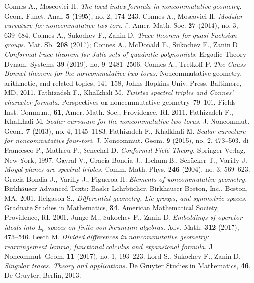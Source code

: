 \documentclass[12pt]{article}
\begin{document}
\begin{thebibliography}{99}
 Connes A., Moscovici H. {\it The local index formula in noncommutative geometry.} Geom. Funct. Anal. {\bf 5} (1995), no. 2, 174--243.
 Connes A., Moscovici H. {\it Modular curvature for noncommutative two-tori.} J. Amer. Math. Soc. {\bf 27} (2014), no. 3, 639--684.
 Connes A., Sukochev F., Zanin D. {\it Trace theorem for quasi-Fuchsian groups.} Mat. Sb. {\bf 208} (2017); Connes A., McDonald E., Sukochev F., Zanin D {\it Conformal trace theorem for Julia sets of quadratic polynomials.} Ergodic Theory Dynam. Systems {\bf 39} (2019), no. 9, 2481--2506.
 Connes A., Tretkoff P. {\it The Gauss-Bonnet theorem for the noncommutative two torus.} Noncommutative geometry, arithmetic, and related topics, 141--158, Johns Hopkins Univ. Press, Baltimore, MD, 2011.
 Fathizadeh F., Khalkhali M. {\it Twisted spectral triples and Connes' character formula.} Perspectives on noncommutative geometry, 79--101, Fields Inst. Commun., {\bf 61}, Amer. Math. Soc., Providence, RI, 2011.
 Fathizadeh F., Khalkhali M. {\it Scalar curvature for the noncommutative two torus.} J. Noncommut. Geom. {\bf 7} (2013), no. 4, 1145--1183; Fathizadeh F., Khalkhali M. {\it Scalar curvature for noncommutative four-tori.} J. Noncommut. Geom. {\bf 9} (2015), no. 2, 473--503.
 di Francesco P., Mathieu P., Senechal D. {\it Conformal Field Theory.} Springer-Verlag, New York, 1997.
 Gayral V., Gracia-Bondia J., Iochum B., Sch\"ucker T., Varilly J. {\it Moyal planes are spectral triples.} Comm. Math. Phys. {\bf 246} (2004), no. 3, 569--623.
 Gracia-Bondia J., Varilly J., Figueroa H. {\it Elements of noncommutative geometry.} Birkh\"auser Advanced Texts: Basler Lehrb\"ucher. Birkh\"auser Boston, Inc., Boston, MA, 2001.
 Helgason S., {\it Differential geometry, Lie groups, and symmetric spaces.} Graduate Studies in Mathematics, {\bf 34}. American Mathematical Society, Providence, RI, 2001.
 Junge M., Sukochev F., Zanin D. {\it Embeddings of operator ideals into $L_p$-spaces on finite von Neumann algebras.} Adv. Math. {\bf 312} (2017), 473--546.
 Lesch M. {\it Divided differences in noncommutative geometry: rearrangement lemma, functional calculus and expansional formula.} J. Noncommut. Geom. {\bf 11} (2017), no. 1, 193--223.
 Lord S., Sukochev F., Zanin D. {\it Singular traces. Theory and applications.} De Gruyter Studies in Mathematics, {\bf 46}. De Gruyter, Berlin, 2013.

\end{thebibliography}
\end{document}
